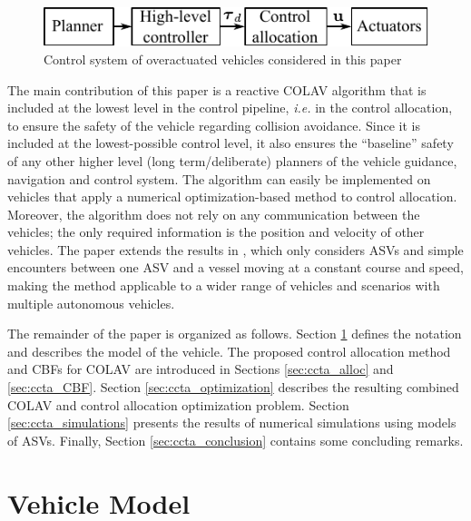 \begin{figure}[b]
    \vspace{-4mm}
    \centering
    \includegraphics[width=.45\textwidth]{figures/ccta/diagram.pdf}
    \vspace{-1mm}
    \caption{Control system of overactuated vehicles considered in this paper}
    \label{fig:ccta_diagram}
\end{figure}

The main contribution of this paper is a reactive COLAV algorithm that is included at the lowest level in the control pipeline, \emph{i.e.} in the control allocation, to ensure the safety of the vehicle regarding collision avoidance.
Since it is included at the lowest-possible control level, it also ensures the ``baseline'' safety of any other higher level (long term/deliberate) planners of the vehicle guidance, navigation and control system.
The algorithm can easily be implemented on vehicles that apply a numerical optimization-based method to control allocation.
Moreover, the algorithm does not rely on any communication between the vehicles; the only required information is the position and velocity of other vehicles.
The paper extends the results in \cite{thyri_reactive_2020}, which only considers ASVs and simple encounters between one ASV and a vessel moving at a constant course and speed, making the method applicable to a wider range of vehicles and scenarios with multiple autonomous vehicles.

The remainder of the paper is organized as follows.
Section \ref{sec:ccta_model} defines the notation and describes the model of the vehicle.
The proposed control allocation method and CBFs for COLAV are introduced in Sections \ref{sec:ccta_alloc} and \ref{sec:ccta_CBF}.
Section \ref{sec:ccta_optimization} describes the resulting combined COLAV and control allocation optimization problem.
Section \ref{sec:ccta_simulations} presents the results of numerical simulations using models of ASVs.
Finally, Section \ref{sec:ccta_conclusion} contains some concluding remarks.

\section{Vehicle Model}
\label{sec:ccta_model}

